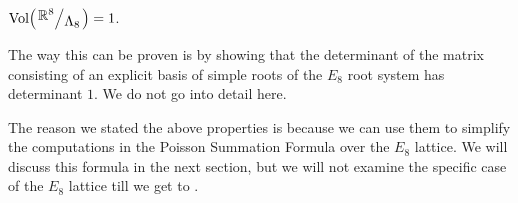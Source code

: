 \begin{boxtheorem}\label{Ch2:Thm:E8_Covolume}
    $\Volof{\quotient{\R^8}{\Lambda_8}} = 1$.
\end{boxtheorem}

The way this can be proven is by showing that the determinant of the matrix consisting of an explicit basis of simple roots of the $E_8$ root system has determinant $1$. We do not go into detail here.

The reason we stated the above properties is because we can use them to simplify the computations in the Poisson Summation Formula over the $E_8$ lattice. We will discuss this formula in the next section, but we will not examine the specific case of the $E_8$ lattice till we get to .
